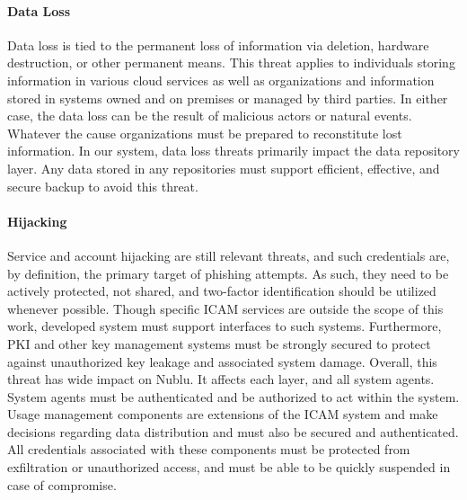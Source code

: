 \documentclass[10pt,letterpaper]{article}
\begin{document}

\paragraph{Data Loss} Data loss is tied to the permanent loss of information via deletion, hardware destruction, or other permanent means. This threat applies to individuals storing information in various cloud services as well as organizations and information stored in systems owned and on premises or managed by third parties. In either case, the data loss can be the result of malicious actors or natural events.  Whatever the cause organizations must be prepared to reconstitute lost information. In our system, data loss threats primarily impact the data repository layer. Any data stored in any repositories must support efficient, effective, and secure backup to avoid this threat.

\paragraph{Hijacking} Service and account hijacking are still relevant threats, and such credentials are, by definition, the primary target of phishing attempts.  As such, they need to be actively protected, not shared, and two-factor identification should be utilized whenever possible.  Though specific ICAM services are outside the scope of this work, developed system must support interfaces to such systems.  Furthermore, PKI and other key management systems must be strongly secured to protect against unauthorized key leakage and associated system damage.  Overall, this threat has wide impact on Nublu.  It affects each layer, and all system agents.  System agents must be authenticated and be authorized to act within the system.  Usage management components are extensions of the ICAM system and make decisions regarding data distribution and must also be secured and authenticated.  All credentials associated with these components must be protected from exfiltration or unauthorized access, and must be able to be quickly suspended in case of compromise.
\end{document}
